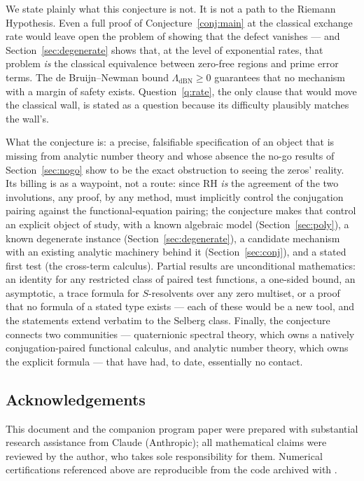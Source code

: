 \documentclass[11pt]{amsart}
\theoremstyle{definition}
\theoremstyle{remark}
\begin{document}
We state plainly what this conjecture is not. It is not a path to the Riemann Hypothesis. Even a full proof of Conjecture~\ref{conj:main} at the classical exchange rate would leave open the problem of showing that the defect vanishes --- and Section~\ref{sec:degenerate} shows that, at the level of exponential rates, that problem \emph{is} the classical equivalence between zero-free regions and prime error terms. The de Bruijn--Newman bound $\Lambda_{\mathrm{dBN}}\ge0$ guarantees that no mechanism with a margin of safety exists. Question~\ref{q:rate}, the only clause that would move the classical wall, is stated as a question because its difficulty plausibly matches the wall's.

What the conjecture is: a precise, falsifiable specification of an object that is missing from analytic number theory and whose absence the no-go results of Section~\ref{sec:nogo} show to be the exact obstruction to seeing the zeros' reality. Its billing is as a waypoint, not a route: since RH \emph{is} the agreement of the two involutions, any proof, by any method, must implicitly control the conjugation pairing against the functional-equation pairing; the conjecture makes that control an explicit object of study, with a known algebraic model (Section~\ref{sec:poly}), a known degenerate instance (Section~\ref{sec:degenerate}), a candidate mechanism with an existing analytic machinery behind it (Section~\ref{sec:conj}), and a stated first test (the cross-term calculus). Partial results are unconditional mathematics: an identity for any restricted class of paired test functions, a one-sided bound, an asymptotic, a trace formula for $S$-resolvents over any zero multiset, or a proof that no formula of a stated type exists --- each of these would be a new tool, and the statements extend verbatim to the Selberg class. Finally, the conjecture connects two communities --- quaternionic spectral theory, which owns a natively conjugation-paired functional calculus, and analytic number theory, which owns the explicit formula --- that have had, to date, essentially no contact.

\subsection*{Acknowledgements}
This document and the companion program paper \cite{ZS} were prepared with substantial research assistance from Claude (Anthropic); all mathematical claims were reviewed by the author, who takes sole responsibility for them. Numerical certifications referenced above are reproducible from the code archived with \cite{ZS}.
\end{document}

